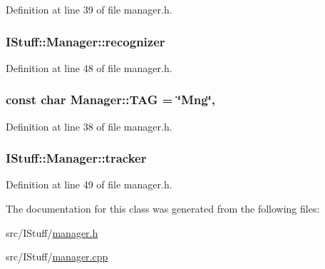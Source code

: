 Definition at line 39 of file manager.\-h.

\hypertarget{class_i_stuff_1_1_manager_ac039aa2e611b04595e4ff69d3534b4cc}{
\subsubsection[{recognizer}]{ I\-Stuff\-::\-Manager\-::recognizer\hspace{0.3cm}{\ttfamily [private]}}}\label{class_i_stuff_1_1_manager_ac039aa2e611b04595e4ff69d3534b4cc}


Definition at line 48 of file manager.\-h.

\hypertarget{class_i_stuff_1_1_manager_a0228682f317a86ce7057b86e9d229ac6}{
\subsubsection[{T\-A\-G}]{\setlength{\rightskip}{0pt plus 5cm}const char Manager\-::\-T\-A\-G = \char`\"{}Mng\char`\"{}\hspace{0.3cm}{\ttfamily [static]}, {\ttfamily [private]}}}\label{class_i_stuff_1_1_manager_a0228682f317a86ce7057b86e9d229ac6}


Definition at line 38 of file manager.\-h.

\hypertarget{class_i_stuff_1_1_manager_a3d313f62a1cfe606098fdcb6f1c748ee}{
\subsubsection[{tracker}]{ I\-Stuff\-::\-Manager\-::tracker\hspace{0.3cm}{\ttfamily [private]}}}\label{class_i_stuff_1_1_manager_a3d313f62a1cfe606098fdcb6f1c748ee}


Definition at line 49 of file manager.\-h.



The documentation for this class was generated from the following files\-:\begin{DoxyCompactItemize}
\item 
src/\-I\-Stuff/\hyperlink{manager_8h}{manager.\-h}\item 
src/\-I\-Stuff/\hyperlink{manager_8cpp}{manager.\-cpp}\end{DoxyCompactItemize}
